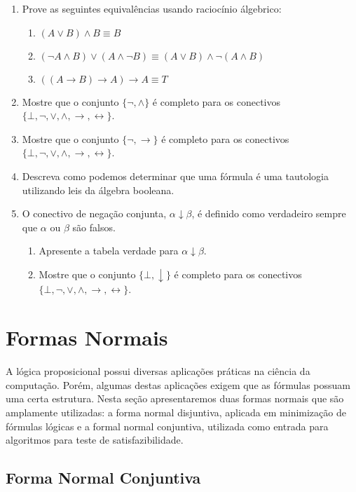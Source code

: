 \begin{enumerate}
	\item Prove as seguintes equival\^encias usando racioc\'inio \'algebrico:
	\begin{enumerate}
		\item $(A\lor B)\land B\equiv B$
		\item $(\neg A\land B)\lor (A\land\neg B)\equiv (A\lor B)\land \neg (A\land B)$
		\item $((A\rightarrow B)\rightarrow A)\rightarrow A\equiv T$
	\end{enumerate}
        \item Mostre que o conjunto $\{\neg,\land\}$ é completo para
          os conectivos
          $\{\bot,\neg,\lor,\land,\to,\leftrightarrow\}$.
        \item Mostre que o conjunto $\{\neg,\to\}$ é completo para os
          conectivos $\{\bot,\neg,\lor,\land,\to,\leftrightarrow\}$.
        \item Descreva como podemos determinar que uma fórmula é uma
          tautologia utilizando leis da álgebra booleana.
        \item O conectivo de negação conjunta,
          $\alpha\downarrow\beta$, é definido como verdadeiro sempre
          que $\alpha$ ou $\beta$ são falsos.
         \begin{enumerate}
              \item Apresente a tabela verdade para
                $\alpha\downarrow\beta$.
              \item Mostre que o conjunto $\{\bot,\downarrow\}$ é completo
                para os conectivos $\{\bot,\neg,\lor,\land,\to,\leftrightarrow\}$.
         \end{enumerate}
\end{enumerate}


\section{Formas Normais}

A lógica proposicional possui diversas aplicações práticas na ciência
da computação. Porém, algumas destas aplicações exigem que as fórmulas
possuam uma certa estrutura. Nesta seção apresentaremos duas formas
normais que são amplamente utilizadas: a forma normal disjuntiva,
aplicada em minimização de fórmulas lógicas e a formal normal
conjuntiva, utilizada como entrada para algoritmos para teste de
satisfazibilidade.

\subsection{Forma Normal Conjuntiva}

